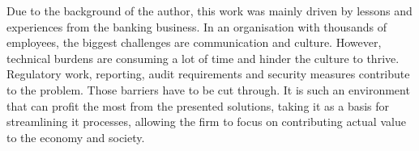 \documentclass[../main.tex]{subfiles}
\begin{document}
    Due to the background of the author, this work was mainly driven by lessons and experiences from the banking business.
    In an organisation with thousands of employees, the biggest challenges are communication and culture.
    However, technical burdens are consuming a lot of time and hinder the culture to thrive.
    Regulatory work, reporting, audit requirements and security measures contribute to the problem.
    Those barriers have to be cut through.
    It is such an environment that can profit the most from the presented solutions, taking it as a basis for streamlining \acrshort{it} processes, allowing the firm to focus on contributing actual value to the economy and society.
\end{document}
